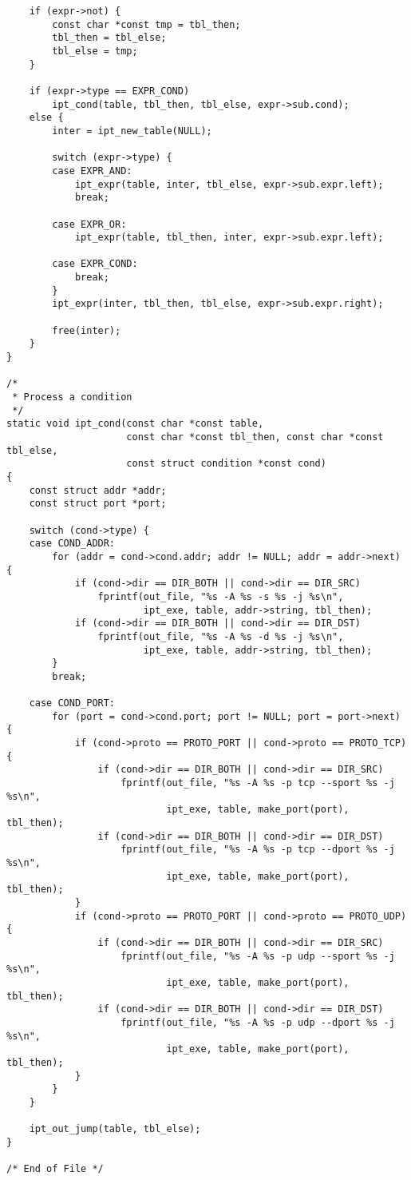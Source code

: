 \documentclass[a4paper,landscape,twocolumn,11pt]{article}
\begin{document}
\begin{lstlisting}
    if (expr->not) {
        const char *const tmp = tbl_then;
        tbl_then = tbl_else;
        tbl_else = tmp;
    }

    if (expr->type == EXPR_COND)
        ipt_cond(table, tbl_then, tbl_else, expr->sub.cond);
    else {
        inter = ipt_new_table(NULL);

        switch (expr->type) {
        case EXPR_AND:
            ipt_expr(table, inter, tbl_else, expr->sub.expr.left);
            break;

        case EXPR_OR:
            ipt_expr(table, tbl_then, inter, expr->sub.expr.left);

        case EXPR_COND:
            break;
        }
        ipt_expr(inter, tbl_then, tbl_else, expr->sub.expr.right);

        free(inter);
    }
}

/*
 * Process a condition
 */
static void ipt_cond(const char *const table,
                     const char *const tbl_then, const char *const tbl_else,
                     const struct condition *const cond)
{
    const struct addr *addr;
    const struct port *port;

    switch (cond->type) {
    case COND_ADDR:
        for (addr = cond->cond.addr; addr != NULL; addr = addr->next) {
            if (cond->dir == DIR_BOTH || cond->dir == DIR_SRC)
                fprintf(out_file, "%s -A %s -s %s -j %s\n",
                        ipt_exe, table, addr->string, tbl_then);
            if (cond->dir == DIR_BOTH || cond->dir == DIR_DST)
                fprintf(out_file, "%s -A %s -d %s -j %s\n",
                        ipt_exe, table, addr->string, tbl_then);
        }
        break;

    case COND_PORT:
        for (port = cond->cond.port; port != NULL; port = port->next) {
            if (cond->proto == PROTO_PORT || cond->proto == PROTO_TCP) {
                if (cond->dir == DIR_BOTH || cond->dir == DIR_SRC)
                    fprintf(out_file, "%s -A %s -p tcp --sport %s -j %s\n",
                            ipt_exe, table, make_port(port), tbl_then);
                if (cond->dir == DIR_BOTH || cond->dir == DIR_DST)
                    fprintf(out_file, "%s -A %s -p tcp --dport %s -j %s\n",
                            ipt_exe, table, make_port(port), tbl_then);
            }
            if (cond->proto == PROTO_PORT || cond->proto == PROTO_UDP) {
                if (cond->dir == DIR_BOTH || cond->dir == DIR_SRC)
                    fprintf(out_file, "%s -A %s -p udp --sport %s -j %s\n",
                            ipt_exe, table, make_port(port), tbl_then);
                if (cond->dir == DIR_BOTH || cond->dir == DIR_DST)
                    fprintf(out_file, "%s -A %s -p udp --dport %s -j %s\n",
                            ipt_exe, table, make_port(port), tbl_then);
            }
        }
    }

    ipt_out_jump(table, tbl_else);
}

/* End of File */
\end{lstlisting}
\end{document}
